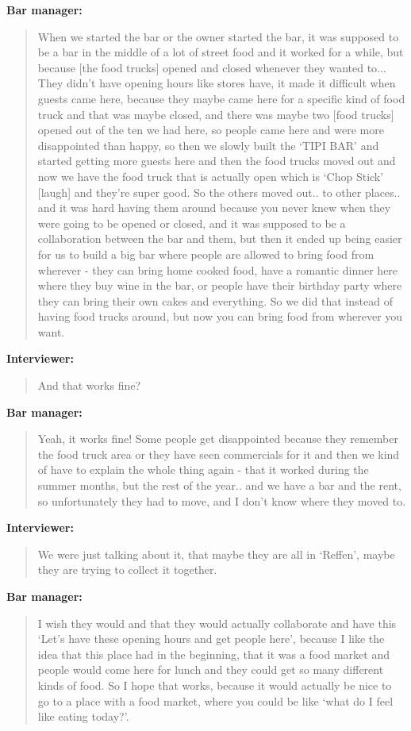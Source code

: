 \textbf{Bar manager:}
\begin{quotation}
When we started the bar or the owner started the bar, it was supposed to be a bar in the middle of a lot of street food and it worked for a while, but because [the food trucks] opened and closed whenever they wanted to... They didn’t have opening hours like stores have, it made it difficult when guests came here, because they maybe came here for a specific kind of food truck and that was maybe closed, and there was maybe two [food trucks] opened out of the ten we had here, so people came here and were more disappointed than happy, so then we slowly built the ‘TIPI BAR’ and started getting more guests here and then the food trucks moved out and now we have the food truck that is actually open which is ‘Chop Stick’ [laugh] and they're super good. So the others moved out.. to other places.. and it was hard having them around because you never knew when they were going to be opened or closed, and it was supposed to be a collaboration between the bar and them, but then it ended up being easier for us to build a big bar where people are allowed to bring food from wherever - they can bring home cooked food, have a romantic dinner here where they buy wine in the bar, or people have their birthday party where they can bring their own cakes and everything. So we did that instead of having food trucks around, but now you can bring food from wherever you want.
\end{quotation}

\textbf{Interviewer:}
\begin{quotation}
And that works fine?
\end{quotation}

\textbf{Bar manager:}
\begin{quotation}
  Yeah, it works fine! Some people get disappointed because they remember the food truck area or they have seen commercials for it and then we kind of have to explain the whole thing again - that it worked during the summer months, but the rest of the year.. and we have a bar and the rent, so unfortunately they had to move, and I don’t know where they moved to.
\end{quotation}

\textbf{Interviewer:}
\begin{quotation}
We were just talking about it, that maybe they are all in ‘Reffen’, maybe they are trying to collect it together.
\end{quotation}

\textbf{Bar manager:}
\begin{quotation}
    I wish they would and that they would actually collaborate and have this ‘Let’s have these opening hours and get people here’, because I like the idea that this place had in the beginning, that it was a food market and people would come here for lunch and they could get so many different kinds of food. So I hope that works, because it would actually be nice to go to a place with a food market, where you could be like ‘what do I feel like eating today?’.
\end{quotation}

